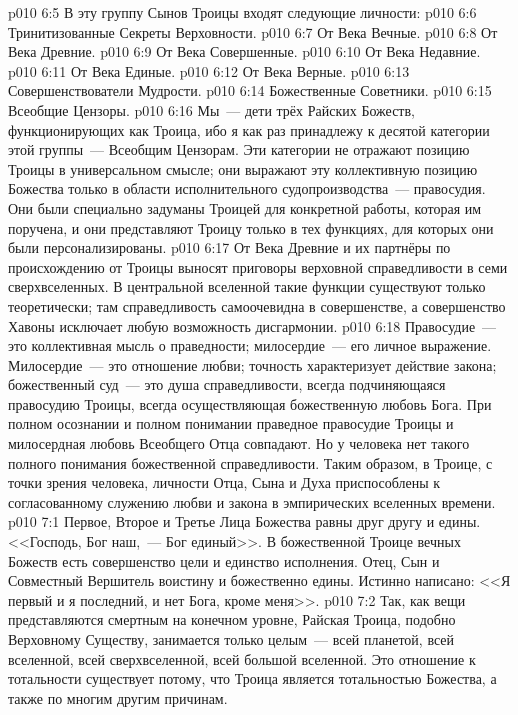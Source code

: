 \vs p010 6:5 \pc В эту группу Сынов Троицы входят следующие личности:
\vs p010 6:6 Тринитизованные Секреты Верховности.
\vs p010 6:7 От Века Вечные.
\vs p010 6:8 От Века Древние.
\vs p010 6:9 От Века Совершенные.
\vs p010 6:10 От Века Недавние.
\vs p010 6:11 От Века Единые.
\vs p010 6:12 От Века Верные.
\vs p010 6:13 Совершенствователи Мудрости.
\vs p010 6:14 Божественные Советники.
\vs p010 6:15 Всеобщие Цензоры.
\vs p010 6:16 \pc Мы~--- дети трёх Райских Божеств, функционирующих как Троица, ибо я как раз принадлежу к десятой категории этой группы~--- Всеобщим Цензорам. Эти категории не отражают позицию Троицы в универсальном смысле; они выражают эту коллективную позицию Божества только в области исполнительного судопроизводства~--- правосудия. Они были специально задуманы Троицей для конкретной работы, которая им поручена, и они представляют Троицу только в тех функциях, для которых они были персонализированы.
\vs p010 6:17 От Века Древние и их партнёры по происхождению от Троицы выносят приговоры верховной справедливости в семи сверхвселенных. В центральной вселенной такие функции существуют только теоретически; там справедливость самоочевидна в совершенстве, а совершенство Хавоны исключает любую возможность дисгармонии.
\vs p010 6:18 Правосудие~--- это коллективная мысль о праведности; милосердие~--- его личное выражение. Милосердие~--- это отношение любви; точность характеризует действие закона; божественный суд~--- это душа справедливости, всегда подчиняющаяся правосудию Троицы, всегда осуществляющая божественную любовь Бога. При полном осознании и полном понимании праведное правосудие Троицы и милосердная любовь Всеобщего Отца совпадают. Но у человека нет такого полного понимания божественной справедливости. Таким образом, в Троице, с точки зрения человека, личности Отца, Сына и Духа приспособлены к согласованному служению любви и закона в эмпирических вселенных времени.
\vs p010 7:1 Первое, Второе и Третье Лица Божества равны друг другу и едины. <<Господь, Бог наш,~--- Бог единый>>. В божественной Троице вечных Божеств есть совершенство цели и единство исполнения. Отец, Сын и Совместный Вершитель воистину и божественно едины. Истинно написано: <<Я первый и я последний, и нет Бога, кроме меня>>.
\vs p010 7:2 \pc Так, как вещи представляются смертным на конечном уровне, Райская Троица, подобно Верховному Существу, занимается только целым~--- всей планетой, всей вселенной, всей сверхвселенной, всей большой вселенной. Это отношение к тотальности существует потому, что Троица является тотальностью Божества, а также по многим другим причинам.
